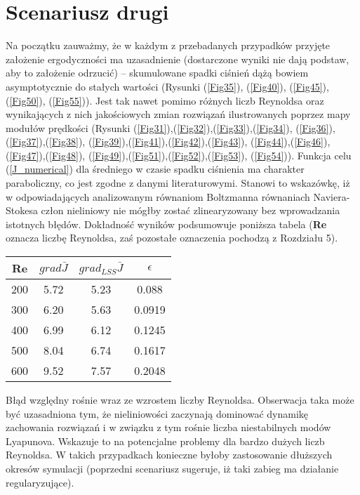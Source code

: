 \documentclass[12pt, twoside]{book}
\begin{document}
\section{Scenariusz drugi}
Na początku zauważmy, że w każdym z przebadanych przypadków przyjęte założenie ergodyczności ma uzasadnienie (dostarczone wyniki nie dają podstaw, aby to założenie odrzucić) – skumulowane spadki ciśnień dążą bowiem asymptotycznie do stałych wartości (Rysunki (\ref{Fig35}), (\ref{Fig40}), (\ref{Fig45}), (\ref{Fig50}), (\ref{Fig55})).  Jest tak nawet pomimo różnych liczb Reynoldsa oraz wynikających z nich jakościowych zmian rozwiązań ilustrowanych poprzez mapy modułów prędkości (Rysunki (\ref{Fig31}),(\ref{Fig32}),(\ref{Fig33}),(\ref{Fig34}), (\ref{Fig36}),(\ref{Fig37}),(\ref{Fig38}), (\ref{Fig39}),(\ref{Fig41}),(\ref{Fig42}),(\ref{Fig43}), (\ref{Fig44}),(\ref{Fig46}),(\ref{Fig47}),(\ref{Fig48}), (\ref{Fig49}),(\ref{Fig51}),(\ref{Fig52}),(\ref{Fig53}), (\ref{Fig54})). \newline
Funkcja celu (\ref{J_numerical}) dla średniego w czasie spadku ciśnienia ma charakter paraboliczny, co jest zgodne z danymi literaturowymi. Stanowi to wskazówkę, iż w odpowiadających analizowanym równaniom Boltzmanna równaniach Naviera-Stokesa człon nieliniowy nie mógłby zostać zlinearyzowany bez wprowadzania istotnych błędów. \newline
Dokładność wyników podsumowuje  poniższa tabela (\textbf{Re} oznacza liczbę Reynoldsa, zaś pozostałe oznaczenia pochodzą z Rozdziału 5). \newline
\begin{center}
	\begin{tabular}{|c|c|c|c|}
		\hline
		\textbf{Re} &$ grad\bar{J} $ & $ grad_{LSS}\bar{J} $ & $\epsilon$\\
		\hline
		200 & 5.72 & 5.23 & 0.088\\
		\hline
		300 & 6.20 & 5.63 & 0.0919\\
		\hline
		400 & 6.99 & 6.12 & 0.1245\\
		\hline
		500 & 8.04 & 6.74 & 0.1617\\
		\hline
		600 & 9.52 & 7.57 & 0.2048\\	
		\hline
	\end{tabular}
\end{center}
Błąd względny rośnie wraz ze wzrostem liczby Reynoldsa. Obserwacja taka może być uzasadniona tym, że nieliniowości zaczynają dominować dynamikę zachowania rozwiązań i w związku z tym rośnie liczba niestabilnych modów Lyapunova. Wskazuje to na potencjalne problemy dla bardzo dużych liczb Reynoldsa. W takich przypadkach konieczne byłoby zastosowanie dłuższych okresów symulacji (poprzedni scenariusz sugeruje, iż taki zabieg ma działanie regularyzujące). \newline
\end{document}
